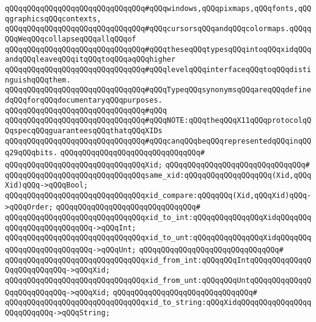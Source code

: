 \verb|qQQqqQQqqQQqqQQqqQQqqQQqqQQqqQQq#qQQqwindows,qQQqpixmaps,qQQqfonts,qQQqgraphicsqQQqcontexts,|\newline
\verb|qQQqqQQqqQQqqQQqqQQqqQQqqQQqqQQq#qQQqcursorsqQQqandqQQqcolormaps.qQQqqQQqWeqQQqcollapseqQQqallqQQqof|\newline
\verb|qQQqqQQqqQQqqQQqqQQqqQQqqQQqqQQq#qQQqtheseqQQqtypesqQQqintoqQQqxidqQQqandqQQqleaveqQQqitqQQqtoqQQqaqQQqhigher|\newline
\verb|qQQqqQQqqQQqqQQqqQQqqQQqqQQqqQQq#qQQqlevelqQQqinterfaceqQQqtoqQQqdistinguishqQQqthem.|\newline
\verb|qQQqqQQqqQQqqQQqqQQqqQQqqQQqqQQq#qQQqTypeqQQqsynonymsqQQqareqQQqdefinedqQQqforqQQqdocumentaryqQQqpurposes.|\newline
\verb|qQQqqQQqqQQqqQQqqQQqqQQqqQQqqQQq#qQQq|\newline
\verb|qQQqqQQqqQQqqQQqqQQqqQQqqQQqqQQq#qQQqNOTE:qQQqtheqQQqX11qQQqprotocolqQQqspecqQQqguaranteesqQQqthatqQQqXIDs|\newline
\verb|qQQqqQQqqQQqqQQqqQQqqQQqqQQqqQQq#qQQqcanqQQqbeqQQqrepresentedqQQqinqQQq29qQQqbits.|\newline
\verb|qQQqqQQqqQQqqQQqqQQqqQQqqQQqqQQq#|\newline
\verb|qQQqqQQqqQQqqQQqqQQqqQQqqQQqqQQqXid;|\newline
\verb|qQQqqQQqqQQqqQQqqQQqqQQqqQQqqQQq#|\newline
\verb|qQQqqQQqqQQqqQQqqQQqqQQqqQQqqQQqsame_xid:qQQqqQQqqQQqqQQqqQQq(Xid,qQQqXid)qQQq->qQQqBool;|\newline
\verb|qQQqqQQqqQQqqQQqqQQqqQQqqQQqqQQqxid_compare:qQQqqQQq(Xid,qQQqXid)qQQq->qQQqOrder;|\newline
\verb|qQQqqQQqqQQqqQQqqQQqqQQqqQQqqQQq#|\newline
\verb|qQQqqQQqqQQqqQQqqQQqqQQqqQQqqQQqxid_to_int:qQQqqQQqqQQqqQQqXidqQQqqQQqqQQqqQQqqQQqqQQqqQQq->qQQqInt;|\newline
\verb|qQQqqQQqqQQqqQQqqQQqqQQqqQQqqQQqxid_to_unt:qQQqqQQqqQQqqQQqXidqQQqqQQqqQQqqQQqqQQqqQQqqQQq->qQQqUnt;|\newline
\verb|qQQqqQQqqQQqqQQqqQQqqQQqqQQqqQQq#|\newline
\verb|qQQqqQQqqQQqqQQqqQQqqQQqqQQqqQQqxid_from_int:qQQqqQQqIntqQQqqQQqqQQqqQQqqQQqqQQqqQQq->qQQqXid;|\newline
\verb|qQQqqQQqqQQqqQQqqQQqqQQqqQQqqQQqxid_from_unt:qQQqqQQqUntqQQqqQQqqQQqqQQqqQQqqQQqqQQq->qQQqXid;|\newline
\verb|qQQqqQQqqQQqqQQqqQQqqQQqqQQqqQQq#|\newline
\verb|qQQqqQQqqQQqqQQqqQQqqQQqqQQqqQQqxid_to_string:qQQqXidqQQqqQQqqQQqqQQqqQQqqQQqqQQq->qQQqString;|\newline
